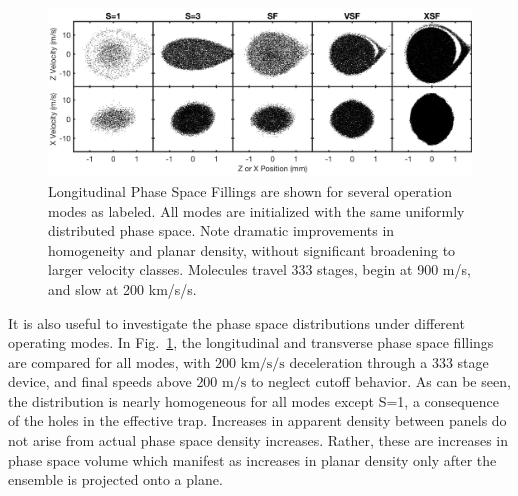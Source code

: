 \documentclass[%
 reprint,
 amsmath,amssymb,
 aps,
prl,
]{revtex4-1}
\begin{document}


\begin{figure}[t]
\includegraphics[width=\linewidth]{5x2-PSD-Compare.png}
\vspace{-22pt}
\caption{\label{fig:phasespace}
Longitudinal Phase Space Fillings are shown for several operation modes as labeled. 
All modes are initialized with the same uniformly distributed phase space.
Note dramatic improvements in homogeneity and planar density, without significant broadening to larger velocity classes. 
Molecules travel 333 stages, begin at 900 m/s, and slow at 200 km/s/s.
}
\end{figure}

It is also useful to investigate the phase space distributions under different operating modes.
In Fig.~\ref{fig:phasespace}, the longitudinal and transverse phase space fillings are compared for all modes, with $200\text{ km/s/s}$ deceleration through a 333 stage device, and final speeds above $200\text{ m/s}$ to neglect cutoff behavior. 
As can be seen, the distribution is nearly homogeneous for all modes except S=1, a consequence of the holes in the effective trap. 
Increases in apparent density between panels do not arise from actual phase space density increases. 
Rather, these are increases in phase space volume which manifest as increases in planar density only after the ensemble is projected onto a plane.
\end{document}
